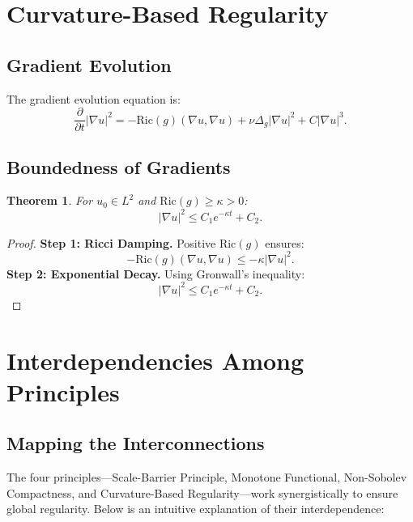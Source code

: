 \documentclass[12pt]{article}
\newtheorem{theorem}{Theorem}[section]
\theoremstyle{definition}
\theoremstyle{remark}
\begin{document}
\section{Curvature-Based Regularity}

\subsection{Gradient Evolution}
The gradient evolution equation is:
\begin{equation}
\frac{\partial}{\partial t} |\nabla u|^2 = -\text{Ric}(g)(\nabla u, \nabla u) + \nu \Delta_g |\nabla u|^2 + C|\nabla u|^3.
\end{equation}

\subsection{Boundedness of Gradients}
\begin{theorem}
For $u_0 \in L^2$ and $\text{Ric}(g) \geq \kappa > 0$:
\begin{equation}
|\nabla u|^2 \leq C_1 e^{-\kappa t} + C_2.
\end{equation}
\end{theorem}

\begin{proof}
\textbf{Step 1: Ricci Damping.} Positive $\text{Ric}(g)$ ensures:
\begin{equation}
-\text{Ric}(g)(\nabla u, \nabla u) \leq -\kappa |\nabla u|^2.
\end{equation}
\textbf{Step 2: Exponential Decay.} Using Gronwall's inequality:
\begin{equation}
|\nabla u|^2 \leq C_1 e^{-\kappa t} + C_2.
\end{equation}
\end{proof}

\section{Interdependencies Among Principles}

\subsection{Mapping the Interconnections}
The four principles---Scale-Barrier Principle, Monotone Functional, Non-Sobolev Compactness, and Curvature-Based Regularity---work synergistically to ensure global regularity. Below is an intuitive explanation of their interdependence:
\end{document}
